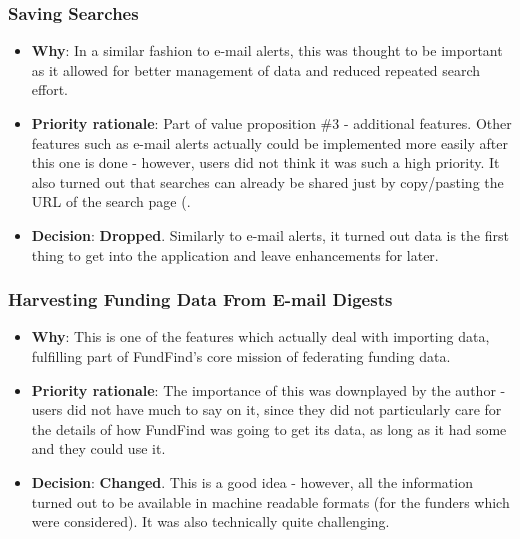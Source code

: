 \subsubsection{Saving Searches}
\label{reqs-saving-searches}
\begin{itemize}
 \item \textbf{Why}: In a similar fashion to e-mail alerts, this was thought to be important as it allowed for better management of data and reduced repeated search effort.
 \item \textbf{Priority rationale}: Part of value proposition \#3 - additional features. Other features such as e-mail alerts actually could be implemented more easily after this one is done - however, users did not think it was such a high priority. It also turned out that searches can already be shared just by copy/pasting the URL of the search page (.
 \item \textbf{Decision}: \textbf{Dropped}. Similarly to e-mail alerts, it turned out data is the first thing to get into the application and leave enhancements for later.
\end{itemize}

\subsubsection{Harvesting Funding Data From E-mail Digests}
\label{devprocess-feats-email-harvest}
\begin{itemize}
 \item \textbf{Why}: This is one of the features which actually deal with importing data, fulfilling part of FundFind's core mission of federating funding data.
 \item \textbf{Priority rationale}: The importance of this was downplayed by the author - users did not have much to say on it, since they did not particularly care for the details of how FundFind was going to get its data, as long as it had some and they could use it.
 \item \textbf{Decision}: \textbf{Changed}. This is a good idea - however, all the information turned out to be available in machine readable formats (for the funders which were considered). It was also technically quite challenging.
\end{itemize}


